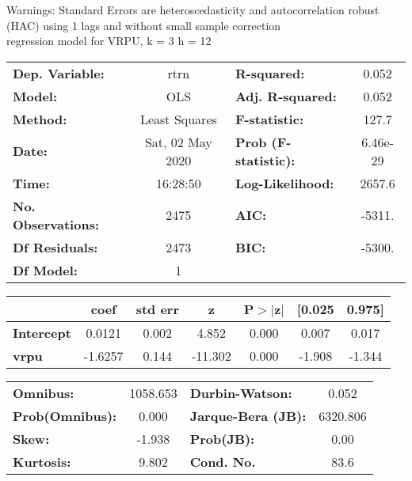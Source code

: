 Warnings: \newline
 [1] Standard Errors are heteroscedasticity and autocorrelation robust (HAC) using 1 lags and without small sample correction\\ 

regression model for VRPU, k = 3 h = 12\begin{center}
\begin{tabular}{lclc}
\toprule
\textbf{Dep. Variable:}    &       rtrn       & \textbf{  R-squared:         } &     0.052   \\
\textbf{Model:}            &       OLS        & \textbf{  Adj. R-squared:    } &     0.052   \\
\textbf{Method:}           &  Least Squares   & \textbf{  F-statistic:       } &     127.7   \\
\textbf{Date:}             & Sat, 02 May 2020 & \textbf{  Prob (F-statistic):} &  6.46e-29   \\
\textbf{Time:}             &     16:28:50     & \textbf{  Log-Likelihood:    } &    2657.6   \\
\textbf{No. Observations:} &        2475      & \textbf{  AIC:               } &    -5311.   \\
\textbf{Df Residuals:}     &        2473      & \textbf{  BIC:               } &    -5300.   \\
\textbf{Df Model:}         &           1      & \textbf{                     } &             \\
\bottomrule
\end{tabular}
\begin{tabular}{lcccccc}
                   & \textbf{coef} & \textbf{std err} & \textbf{z} & \textbf{P$> |$z$|$} & \textbf{[0.025} & \textbf{0.975]}  \\
\midrule
\textbf{Intercept} &       0.0121  &        0.002     &     4.852  &         0.000        &        0.007    &        0.017     \\
\textbf{vrpu}      &      -1.6257  &        0.144     &   -11.302  &         0.000        &       -1.908    &       -1.344     \\
\bottomrule
\end{tabular}
\begin{tabular}{lclc}
\textbf{Omnibus:}       & 1058.653 & \textbf{  Durbin-Watson:     } &    0.052  \\
\textbf{Prob(Omnibus):} &   0.000  & \textbf{  Jarque-Bera (JB):  } & 6320.806  \\
\textbf{Skew:}          &  -1.938  & \textbf{  Prob(JB):          } &     0.00  \\
\textbf{Kurtosis:}      &   9.802  & \textbf{  Cond. No.          } &     83.6  \\
\bottomrule
\end{tabular}
\end{center}

